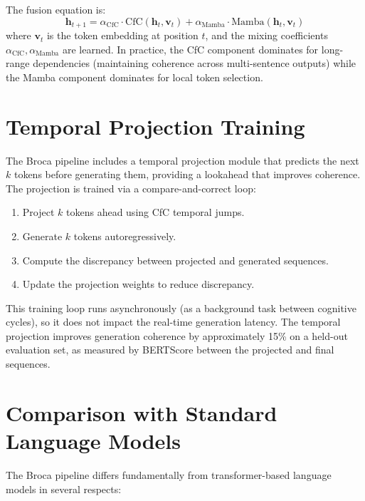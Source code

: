 \documentclass[12pt]{book}
\begin{document}
The fusion equation is:
\begin{equation}
\mathbf{h}_{t+1} = \alpha_{\text{CfC}} \cdot \text{CfC}(\mathbf{h}_t, \mathbf{v}_t) + \alpha_{\text{Mamba}} \cdot \text{Mamba}(\mathbf{h}_t, \mathbf{v}_t)
\end{equation}
where $\mathbf{v}_t$ is the token embedding at position $t$, and the mixing coefficients $\alpha_{\text{CfC}}, \alpha_{\text{Mamba}}$ are learned. In practice, the CfC component dominates for long-range dependencies (maintaining coherence across multi-sentence outputs) while the Mamba component dominates for local token selection.

\section{Temporal Projection Training}

The Broca pipeline includes a temporal projection module that predicts the next $k$ tokens before generating them, providing a lookahead that improves coherence. The projection is trained via a compare-and-correct loop:

\begin{enumerate}
  \item Project $k$ tokens ahead using CfC temporal jumps.
  \item Generate $k$ tokens autoregressively.
  \item Compute the discrepancy between projected and generated sequences.
  \item Update the projection weights to reduce discrepancy.
\end{enumerate}

This training loop runs asynchronously (as a background task between cognitive cycles), so it does not impact the real-time generation latency. The temporal projection improves generation coherence by approximately 15\% on a held-out evaluation set, as measured by BERTScore between the projected and final sequences.

\section{Comparison with Standard Language Models}

The Broca pipeline differs fundamentally from transformer-based language models in several respects:
\end{document}
